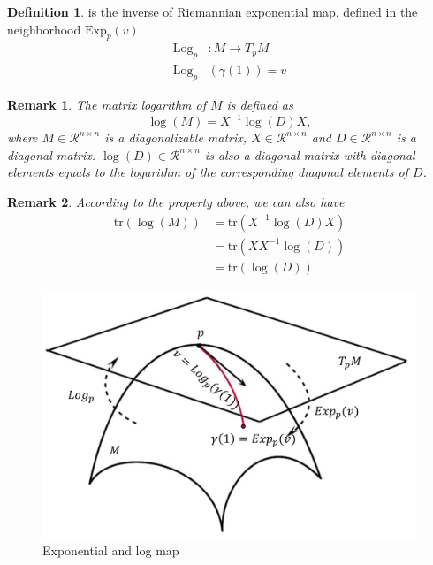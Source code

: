 \documentclass[a4paper]{article}
\theoremstyle{definition}
\newtheorem{definition}{Definition}
\theoremstyle{plain}
\newtheorem{remark}{Remark}
\begin{document}
\begin{definition}
 is the inverse of Riemannian exponential map, defined in the neighborhood $\mathrm{Exp}_p(v)$
\begin{align*}
    \mathrm{Log}_p&:M\rightarrow T_pM\\
    \mathrm{Log}_p&(\gamma(1))=v
\end{align*}
\end{definition}

\begin{remark}
The matrix logarithm of $M$ is defined as
\begin{equation*}
    \log(M)=X^{-1}\log(D)X,
\end{equation*}
where $M\in\mathcal{R}^{n\times n}$ is a diagonalizable matrix, $X\in\mathcal{R}^{n\times n}$ and $D\in\mathcal{R}^{n\times n}$ is a diagonal matrix. $\log(D)\in\mathcal{R}^{n\times n}$ is also a diagonal matrix with diagonal elements equals to the logarithm of the corresponding diagonal elements of $D$.
\end{remark}

\begin{remark}
According to the property above, we can also have 
\begin{align*}
    \mathrm{tr}(\log(M))&=\mathrm{tr}(X^{-1}\log(D)X)\\
    &=\mathrm{tr}(XX^{-1}\log(D))\\
    &=\mathrm{tr}(\log(D))
\end{align*}
\end{remark}

\begin{figure}[H]
   \centering
   \includegraphics[scale=0.15]{figure/map.png}
   \caption{Exponential and log map}
\end{figure}
\end{document}

